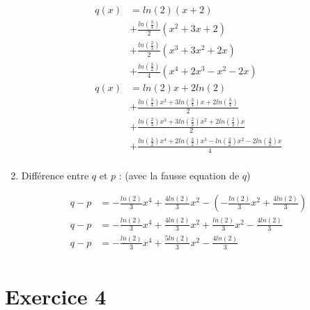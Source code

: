 \documentclass[12pt, letterpaper]{article}
\begin{document}
\begin{enumerate}
  \begin{equation*}
    \begin{split}
      q(x) & = ln(2) (x + 2) \\
      & + \frac{ln(\frac{3}{4})}{2} (x^2 + 3x + 2) \\
      & + \frac{ln(\frac{2}{3})}{2} (x^3 + 3x^2 + 2x) \\
      & + \frac{ln(\frac{3}{2})}{4} (x^4 + 2x^3 - x^2 -
      2x) \\
      q(x) & = ln(2)x + 2ln(2) \\
      & + \frac{ln(\frac{3}{4}) x^2 + 3 ln(\frac{3}{4}) x + 2 ln(\frac{3}{4})}{2}\\
      & + \frac{ln(\frac{2}{3}) x^3 + 3 ln(\frac{2}{3}) x^2 + 2
        ln(\frac{2}{3}) x}{2} \\
      & + \frac{ln(\frac{3}{2}) x^4 + 2 ln(\frac{3}{2}) x^3 -
        ln(\frac{3}{2}) x^2 - 2 ln(\frac{3}{2}) x}{4} \\
    \end{split}
  \end{equation*}

\item Différence entre $q$ et $p$ : (avec la fausse equation de $q$)

  \begin{equation*}
    \begin{split}
      q - p & = - \frac{ln(2)}{3}x^4 + \frac{4ln(2)}{3}x^2 - (- \frac{
        ln(2)}{3}x^2 + \frac{4ln(2)}{3}) \\
      q - p & = - \frac{ln(2)}{3}x^4 + \frac{4ln(2)}{3}x^2 + \frac{
        ln(2)}{3}x^2 - \frac{4ln(2)}{3} \\
      q - p & = - \frac{ln(2)}{3}x^4 + \frac{5ln(2)}{3}x^2 - \frac{4ln(2)}{3} \\
    \end{split}
  \end{equation*}
  
\end{enumerate}

\section*{Exercice 4}
\end{document}
